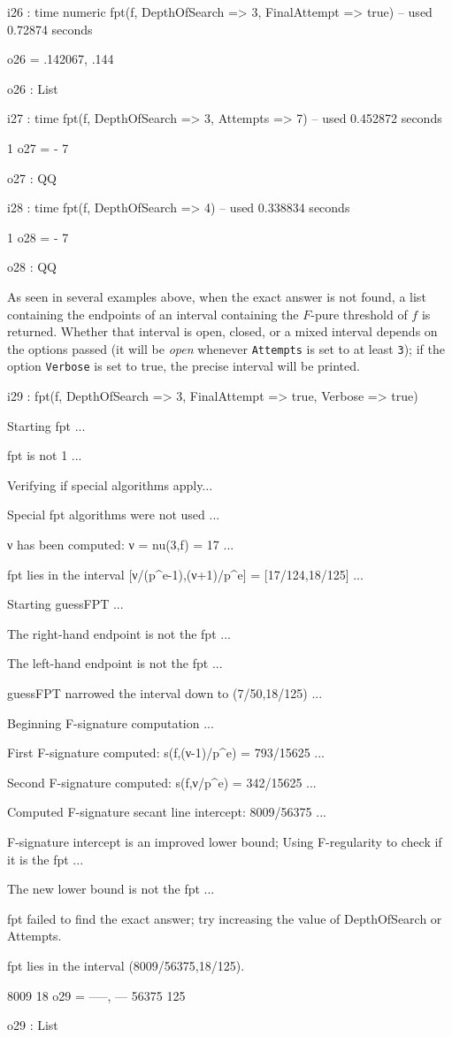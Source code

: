 \documentclass{amsart}
\begin{document}
\smallskip
{\small
{}
\begin{MyVerbatim}
i26 : time numeric fpt(f, DepthOfSearch => 3, FinalAttempt => true)
     -- used 0.72874 seconds

o26 = {.142067, .144}

o26 : List

i27 : time fpt(f, DepthOfSearch => 3, Attempts => 7) 
     -- used 0.452872 seconds

      1
o27 = -
      7

o27 : QQ

i28 : time fpt(f, DepthOfSearch => 4) 
     -- used 0.338834 seconds

      1
o28 = -
      7

o28 : QQ
\end{MyVerbatim}
}
\smallskip

As seen in several examples above, when the exact answer is not found, a list containing the endpoints of an interval containing the $F$-pure threshold of $f$ is returned.
Whether that interval is open, closed, or a mixed interval depends on the options passed (it will be \emph{open} whenever \texttt{Attempts} is set to at least \texttt{3}); if the option \texttt{Verbose} is set to true, the precise interval will be printed.

\smallskip
{\small
{}
\begin{MyVerbatim}
i29 : fpt(f, DepthOfSearch => 3, FinalAttempt => true, Verbose => true)

Starting fpt ...

fpt is not 1 ...

Verifying if special algorithms apply...

Special fpt algorithms were not used ...

ν has been computed: ν = nu(3,f) = 17 ...

fpt lies in the interval [ν/(p^e-1),(ν+1)/p^e] = [17/124,18/125] ...

Starting guessFPT ...

The right-hand endpoint is not the fpt ...

The left-hand endpoint is not the fpt ...

guessFPT narrowed the interval down to (7/50,18/125) ...

Beginning F-signature computation ...

First F-signature computed: s(f,(ν-1)/p^e) = 793/15625 ...

Second F-signature computed: s(f,ν/p^e) = 342/15625 ...

Computed F-signature secant line intercept: 8009/56375 ...

F-signature intercept is an improved lower bound;
Using F-regularity to check if it is the fpt ...

The new lower bound is not the fpt ...

fpt failed to find the exact answer; try increasing the value of
    DepthOfSearch or Attempts.

fpt lies in the interval (8009/56375,18/125).

        8009   18
o29 = {-----, ---}
       56375  125

o29 : List
\end{MyVerbatim}
}
\smallskip
\end{document}
